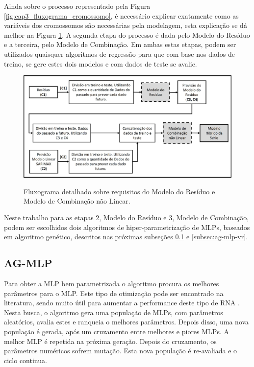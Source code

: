Ainda sobre o processo representado pela Figura \ref{fig:cap3_fluxograma_cromossomo}, é necessário explicar exatamente como as variáveis dos cromossomos são necessárias pela modelagem, esta explicação se dá melhor na Figura \ref{fig:cap3_fluxograma_modelos_res_comb}. A segunda etapa do processo é dada pelo Modelo do Resíduo e a terceira, pelo Modelo de Combinação. Em ambas estas etapas, podem ser utilizados quaisquer algoritmos de regressão para que com base nos dados de treino, se gere estes dois modelos e com dados de teste se avalie.

\begin{figure}[!htbp]
    \centering
    \caption{Fluxograma detalhado sobre requisitos do Modelo do Resíduo e Modelo de Combinação não Linear.}
    \includegraphics[width=\textwidth]{Figuras/mat_e_met/fluxograma_modelos_res_comb.jpg}
    \label{fig:cap3_fluxograma_modelos_res_comb}
\end{figure}

Neste trabalho para as etapas 2, Modelo do Resíduo e 3, Modelo de Combinação, podem ser escolhidos dois algoritmos de hiper-parametrização de MLPs, baseados em algoritmo genético, descritos nas próximas subseções \ref{subsec:ag-mlp} e \ref{subsec:ag-mlp-vr}.

\subsection{AG-MLP}
\label{subsec:ag-mlp}

Para obter a MLP bem parametrizada o algoritmo procura os melhores parâmetros para o MLP. Este tipo de otimização pode ser encontrado na literatura, sendo muito útil para aumentar a performance deste tipo de RNA \cite{ramchoun2016multilayer, idrissi2016genetic}. Nesta busca, o algoritmo gera uma população de MLPs, com parâmetros aleatórios, avalia estes e ranqueia o melhores parâmetros. Depois disso, uma nova população é gerada, após um cruzamento entre melhores e piores MLPs. A melhor MLP é repetida na próxima geração. Depois do cruzamento, os parâmetros numéricos sofrem mutação. Esta nova população é re-avaliada e o ciclo continua.

